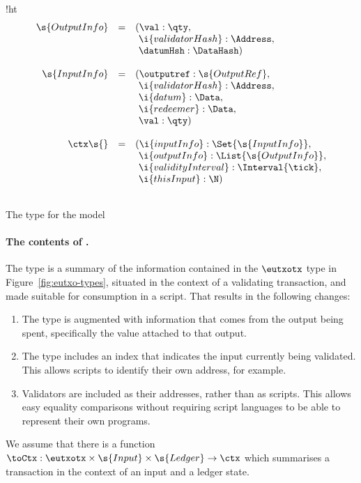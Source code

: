 \begin{ruledfigure}{!ht}
  \begin{displaymath}
  \begin{array}{rll}
    \s{OutputInfo } &=&(\val: \qty,\\
                    & &\ \i{validatorHash}: \Address,\\
                    & &\ \datumHsh: \DataHash)\\
    \\
    \s{InputInfo } &=&(\outputref: \s{OutputRef},\\
                   & &\ \i{validatorHash}: \Address,\\
                   & &\ \i{datum}: \Data,\\
                   & &\ \i{redeemer}: \Data,\\
                   & &\ \val: \qty)\\
     \\
     \ctx\s{ } &=&(\i{inputInfo}: \Set{\s{InputInfo}},\\
               & &\ \i{outputInfo}: \List{\s{OutputInfo}},\\
               & &\ \i{validityInterval}: \Interval{\tick},\\
               & &\ \i{thisInput}: \N)\\
     \\
  \end{array}
  \end{displaymath}
  \caption{The \ctx{} type for the \EUTXO{} model}
  \label{fig:ptx-1-types}
\end{ruledfigure}

\paragraph{The contents of \ctx{}.}
The \ctx{} type is a summary of the information contained in the $\eutxotx$ type in
Figure~\ref{fig:eutxo-types}, situated in the context of a validating
transaction, and made suitable for consumption in a script. That results in the following changes:
\begin{enumerate}
\item The  type is augmented with information that comes
  from the output being spent, specifically the value attached to that output.
\item The \ctx{} type includes an index that indicates the input currently
  being validated. This allows scripts to identify their own address, for example.
\item Validators are included as their addresses, rather than as scripts. This
  allows easy equality comparisons without requiring script languages to be able
  to represent their own programs.
\end{enumerate}
\noindent We assume that there is a function $\toCtx: \eutxotx \times
  \s{Input} \times \s{Ledger} \rightarrow \ctx$ which summarises a
transaction in the context of an input and a ledger state.

